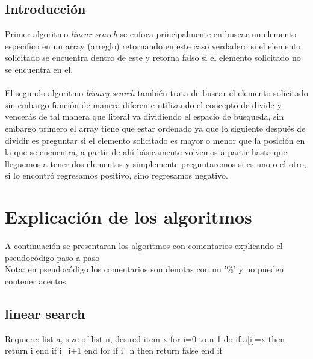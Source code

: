\documentclass{article}
\begin{document}
\begin{multicols}{2}
\section{Introducción}\label{Introducción}                              	%
  Primer algoritmo \textit{linear search} se enfoca principalmente en buscar un elemento especifico
  en un array (arreglo) retornando en este caso verdadero si el elemento solicitado se encuentra dentro de este
  y retorna falso si el elemento solicitado no se encuentra en el.\\
  \\
  El segundo algoritmo \textit{binary search} también trata de buscar el elemento solicitado sin embargo función 
  de manera diferente utilizando el concepto de divide y vencerás de tal manera que literal va dividiendo el espacio de búsqueda,
  sin embargo primero el array tiene que estar ordenado ya que lo siguiente después de dividir es preguntar si el elemento solicitado 
  es mayor o menor que la posición en la que se encuentra, a partir de ahí básicamente volvemos a partir hasta que lleguemos a tener dos elementos
  y simplemente preguntaremos si es uno o el otro, si lo encontró regresamos positivo, sino regresamos negativo.
\end{multicols}
\section{Explicación de los algoritmos}\label{explicacion}				%
A continuación se presentaran los algoritmos con comentarios explicando el pseudocódigo paso a paso\\ 
Nota: en pseudocódigo los comentarios son denotas con un '\%' y no pueden contener acentos.
  \subsection*{linear search}\label{ls}
    \begin{code}
      Requiere: list a, size of list n, desired item x
        for i=0 to n-1 do
          if a[i]=x then
            return i
          end if
          i=i+1
        end for
      if i=n then
        return false
      end if
    \end{code}
\end{document}
